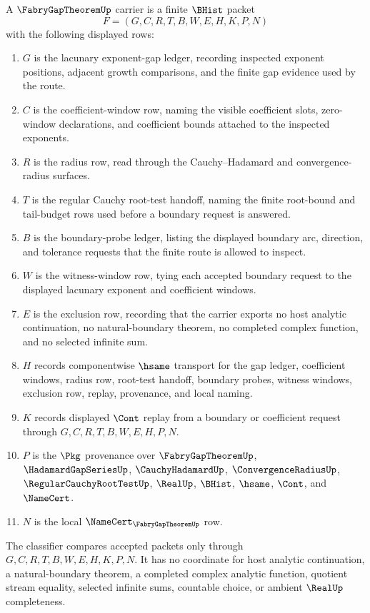 \begin{definition}
\label{def:fabry-gap-theorem-carrier}
A $\FabryGapTheoremUp$ carrier is a finite $\BHist$ packet
$$
F=(G,C,R,T,B,W,E,H,K,P,N)
$$
with the following displayed rows:
\begin{enumerate}
\item $G$ is the lacunary exponent-gap ledger, recording inspected exponent positions, adjacent growth comparisons, and the finite gap evidence used by the route.
\item $C$ is the coefficient-window row, naming the visible coefficient slots, zero-window declarations, and coefficient bounds attached to the inspected exponents.
\item $R$ is the radius row, read through the Cauchy--Hadamard and convergence-radius surfaces.
\item $T$ is the regular Cauchy root-test handoff, naming the finite root-bound and tail-budget rows used before a boundary request is answered.
\item $B$ is the boundary-probe ledger, listing the displayed boundary arc, direction, and tolerance requests that the finite route is allowed to inspect.
\item $W$ is the witness-window row, tying each accepted boundary request to the displayed lacunary exponent and coefficient windows.
\item $E$ is the exclusion row, recording that the carrier exports no host analytic continuation, no natural-boundary theorem, no completed complex function, and no selected infinite sum.
\item $H$ records componentwise $\hsame$ transport for the gap ledger, coefficient windows, radius row, root-test handoff, boundary probes, witness windows, exclusion row, replay, provenance, and local naming.
\item $K$ records displayed $\Cont$ replay from a boundary or coefficient request through $G,C,R,T,B,W,E,H,P,N$.
\item $P$ is the $\Pkg$ provenance over $\FabryGapTheoremUp$, $\HadamardGapSeriesUp$, $\CauchyHadamardUp$, $\ConvergenceRadiusUp$, $\RegularCauchyRootTestUp$, $\RealUp$, $\BHist$, $\hsame$, $\Cont$, and $\NameCert$.
\item $N$ is the local $\NameCert_{\FabryGapTheoremUp}$ row.
\end{enumerate}
The classifier compares accepted packets only through $G,C,R,T,B,W,E,H,K,P,N$. It has no coordinate for host analytic continuation, a natural-boundary theorem, a completed complex analytic function, quotient stream equality, selected infinite sums, countable choice, or ambient $\RealUp$ completeness.
\end{definition}

